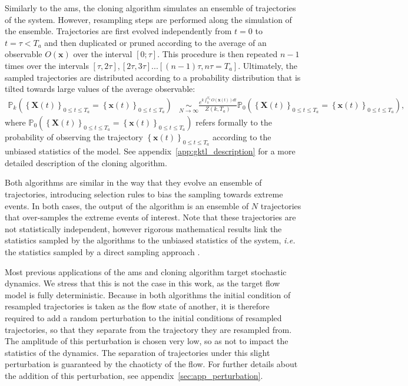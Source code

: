 \documentclass{jfm}
\begin{document}
Similarly to the \ac{ams}, the cloning algorithm simulates an ensemble of trajectories of the system.
However, resampling steps are performed along the simulation of the ensemble.
Trajectories are first evolved independently from $t = 0$ to $t=\tau < T_a$ and then duplicated or pruned
according to the average of an observable $O(\mathbf{x})$ over the interval $[0;\tau]$.
This procedure is then repeated $n-1$ times over the intervals $[\tau, 2\tau], [2\tau, 3\tau]... [(n-1)\tau, n\tau = T_a]$.
Ultimately, the sampled trajectories are distributed according to a probability distribution that is tilted towards large values of the average observable:
\begin{align}
\mathbb{P}_{k}\left(\left\{ \mathbf{X}(t)\right\} _{0\leq t\leq T_{a}}=\left\{ \mathbf{x}(t)\right\} _{0\leq t\leq T_{a}}\right) &\underset{N\rightarrow\infty}{\sim} \frac{e^{k\int_{0}^{T_{a}}O(\mathbf{x}(t))dt}}{Z(k,T_a)}\mathbb{\mathbb{P}}_{0}\left(\left\{ \mathbf{X}(t)\right\} _{0\leq t\leq T_{a}}=\left\{ \mathbf{x}(t)\right\} _{0\leq t\leq T_{a}}\right),
\label{eq:Biased_Path_Approximation_main}
\end{align}
where
$\mathbb{P}_{0}\left(\left\{ \mathbf{X}(t)\right\} _{0\leq t\leq T_{a}} = \left\{ \mathbf{x}(t)\right\} _{0\leq t\leq T_{a}}\right)$ refers formally to the probability of observing the trajectory
$\left\{ \mathbf{x}(t)\right\} _{0\leq t\leq T_{a}}$ according to the unbiased statistics of the model.
See appendix~\ref{app:gktl_description} for a more detailed description of the cloning algorithm.

Both algorithms are similar in the way that they evolve an ensemble of trajectories, introducing selection
rules to bias the sampling towards extreme events.
In both cases, the output of the algorithm is an ensemble of $N$ trajectories that over-samples the extreme
events of interest.
Note that these trajectories are not statistically independent, however rigorous mathematical results link the statistics sampled by the algorithms to the unbiased statistics of the system, \textit{i.e.} the statistics sampled by a direct sampling approach \citep{DelMoral2013, brehier:hal-01142704}.

Most previous applications of the \ac{ams} and cloning algorithm target stochastic dynamics.
We stress that this is not the case in this work, as the target flow model is fully deterministic.
Because in both algorithms the initial condition of resampled trajectories is taken as the flow state of another, it is therefore required to add a random perturbation to the initial conditions of resampled trajectories, so that they separate from the trajectory they are resampled from.
The amplitude of this perturbation is chosen very low, so as not to impact the statistics of the dynamics.
The separation of trajectories under this slight perturbation is guaranteed by the chaoticty of the flow.
For further details about the addition of this perturbation, see appendix~\ref{sec:app_perturbation}.
\end{document}
